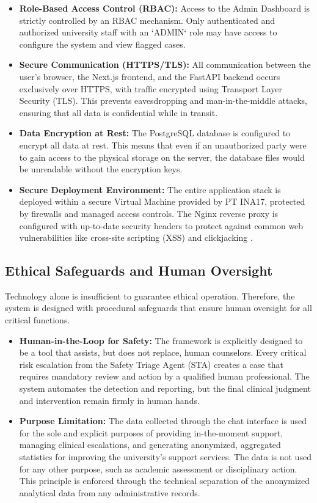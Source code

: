 \begin{itemize}
    \item \textbf{Role-Based Access Control (RBAC):} Access to the Admin Dashboard is strictly controlled by an RBAC mechanism. Only authenticated and authorized university staff with an `ADMIN` role may have access to configure the system and view flagged cases.
    \item \textbf{Secure Communication (HTTPS/TLS):} All communication between the user's browser, the Next.js frontend, and the FastAPI backend occurs exclusively over HTTPS, with traffic encrypted using Transport Layer Security (TLS). This prevents eavesdropping and man-in-the-middle attacks, ensuring that all data is confidential while in transit.
    \item \textbf{Data Encryption at Rest:} The PostgreSQL database is configured to encrypt all data at rest. This means that even if an unauthorized party were to gain access to the physical storage on the server, the database files would be unreadable without the encryption keys.
    \item \textbf{Secure Deployment Environment:} The entire application stack is deployed within a secure Virtual Machine provided by PT INA17, protected by firewalls and managed access controls. The Nginx reverse proxy is configured with up-to-date security headers to protect against common web vulnerabilities like cross-site scripting (XSS) and clickjacking \cite{FIND_CITATION_HERE}.
\end{itemize}

\subsection{Ethical Safeguards and Human Oversight}

Technology alone is insufficient to guarantee ethical operation. Therefore, the system is designed with procedural safeguards that ensure human oversight for all critical functions.

\begin{itemize}
    \item \textbf{Human-in-the-Loop for Safety:} The framework is explicitly designed to be a tool that assists, but does not replace, human counselors. Every critical risk escalation from the Safety Triage Agent (STA) creates a case that requires mandatory review and action by a qualified human professional. The system automates the detection and reporting, but the final clinical judgment and intervention remain firmly in human hands.
    \item \textbf{Purpose Limitation:} The data collected through the chat interface is used for the sole and explicit purposes of providing in-the-moment support, managing clinical escalations, and generating anonymized, aggregated statistics for improving the university's support services. The data is not used for any other purpose, such as academic assessment or disciplinary action. This principle is enforced through the technical separation of the anonymized analytical data from any administrative records.
\end{itemize}

